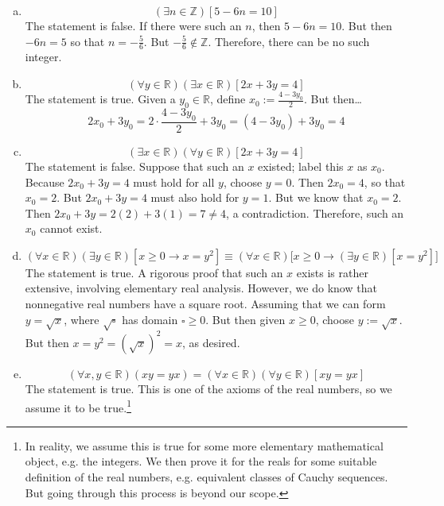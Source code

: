 \documentclass[11pt,letterpaper]{article}
\begin{document}
\sol 
\begin{enumerate}[(a)]
\item 
	\[
	(\exists n \in \mathbb{Z}) [5 - 6n= 10]
	\]
The statement is false. If there were such an $n$, then $5 - 6n= 10$. But then $-6n= 5$ so that $n= -\frac{5}{6}$. But $-\frac{5}{6} \notin \mathbb{Z}$. Therefore, there can be no such integer. \pspace

\item 
	\[
	(\forall y \in \mathbb{R}) (\exists x \in \mathbb{R}) [2x + 3y= 4]
	\]
The statement is true. Given a $y_0 \in \mathbb{R}$, define $x_0:= \frac{4 - 3y_0}{2}$. But then\dots
	\[
	2x_0 + 3y_0= 2 \cdot \dfrac{4 - 3y_0}{2} + 3y_0= (4 - 3y_0) + 3y_0= 4
	\] \pspace

\item 
	\[
	(\exists x \in \mathbb{R}) (\forall y \in \mathbb{R}) [2x + 3y= 4]
	\]
The statement is false. Suppose that such an $x$ existed; label this $x$ as $x_0$. Because $2x_0 + 3y= 4$ must hold for all $y$, choose $y= 0$. Then $2x_0= 4$, so that $x_0= 2$. But $2x_0 + 3y= 4$ must also hold for $y= 1$. But we know that $x_0= 2$. Then $2x_0 + 3y= 2(2) + 3(1)= 7 \neq 4$, a contradiction. Therefore, such an $x_0$ cannot exist. \pspace

\item 
	\[
	(\forall x \in \mathbb{R}) (\exists y \in \mathbb{R}) [x \geq 0 \to x= y^2] \equiv (\forall x \in \mathbb{R}) \big[x \geq 0 \to (\exists y \in \mathbb{R}) [x= y^2] \big]
	\]
The statement is true. A rigorous proof that such an $x$ exists is rather extensive, involving elementary real analysis. However, we do know that nonnegative real numbers have a square root. Assuming that we can form $y= \sqrt{x}$, where $\sqrt{\square}$ has domain $\square \geq 0$. But then given $x \geq 0$, choose $y:= \sqrt{x}$. But then $x= y^2= (\sqrt{x})^2= x$, as desired. \pspace

\item 
	\[
	(\forall x, y \in \mathbb{R}) (xy = yx)= (\forall x \in \mathbb{R}) (\forall y \in \mathbb{R}) [xy= yx]
	\]
The statement is true. This is one of the axioms of the real numbers, so we assume it to be true.\footnote{In reality, we assume this is true for some more elementary mathematical object, e.g. the integers. We then prove it for the reals for some suitable definition of the real numbers, e.g. equivalent classes of Cauchy sequences. But going through this process is beyond our scope.}
\end{enumerate}
\end{document}

